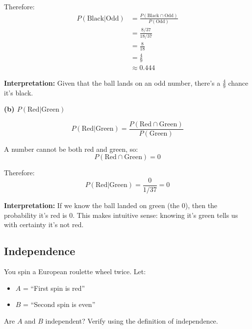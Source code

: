 \documentclass[11pt,a4paper]{article}
\begin{document}
\begin{answer}
Therefore:
\begin{align}
P(\text{Black}|\text{Odd}) &= \frac{P(\text{Black} \cap \text{Odd})}{P(\text{Odd})}\\
&= \frac{8/37}{18/37}\\
&= \frac{8}{18}\\
&= \frac{4}{9}\\
&\approx 0.444
\end{align}

\textbf{Interpretation:} Given that the ball lands on an odd number, there's a $\frac{4}{9}$ chance it's black.

\vspace{0.5cm}

\textbf{(b) $P(\text{Red}|\text{Green})$}

\[
P(\text{Red}|\text{Green}) = \frac{P(\text{Red} \cap \text{Green})}{P(\text{Green})}
\]

A number cannot be both red and green, so:
\[
P(\text{Red} \cap \text{Green}) = 0
\]

Therefore:
\[
P(\text{Red}|\text{Green}) = \frac{0}{1/37} = 0
\]

\textbf{Interpretation:} If we know the ball landed on green (the 0), then the probability it's red is 0. This makes intuitive sense: knowing it's green tells us with certainty it's not red.
\end{answer}

\subsection*{Independence}

\begin{question}
You spin a European roulette wheel twice. Let:
\begin{itemize}
    \item $A$ = ``First spin is red''
    \item $B$ = ``Second spin is even''
\end{itemize}

Are $A$ and $B$ independent? Verify using the definition of independence.
\end{question}
\end{document}
